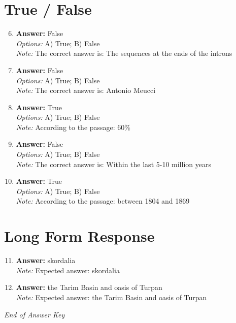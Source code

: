 \documentclass[12pt]{article}
\begin{document}
\section*{True / False}
\begin{enumerate}[label=\arabic*.]
\setcounter{enumi}{5}
\item \textbf{Answer:} False
\\ \textit{Options:} A) True; B) False
\\ \textit{Note:} The correct answer is: The sequences at the ends of the introns
\item \textbf{Answer:} False
\\ \textit{Options:} A) True; B) False
\\ \textit{Note:} The correct answer is: Antonio Meucci
\item \textbf{Answer:} True
\\ \textit{Options:} A) True; B) False
\\ \textit{Note:} According to the passage: 60\%
\item \textbf{Answer:} False
\\ \textit{Options:} A) True; B) False
\\ \textit{Note:} The correct answer is: Within the last 5-10 million years
\item \textbf{Answer:} True
\\ \textit{Options:} A) True; B) False
\\ \textit{Note:} According to the passage: between 1804 and 1869
\end{enumerate}

\section*{Long Form Response}
\begin{enumerate}[label=\arabic*.]
\setcounter{enumi}{10}
\item \textbf{Answer:} skordalia
\\ \textit{Note:} Expected answer: skordalia
\item \textbf{Answer:} the Tarim Basin and oasis of Turpan
\\ \textit{Note:} Expected answer: the Tarim Basin and oasis of Turpan
\end{enumerate}

\vfill
\noindent\textit{End of Answer Key}
\end{document}
